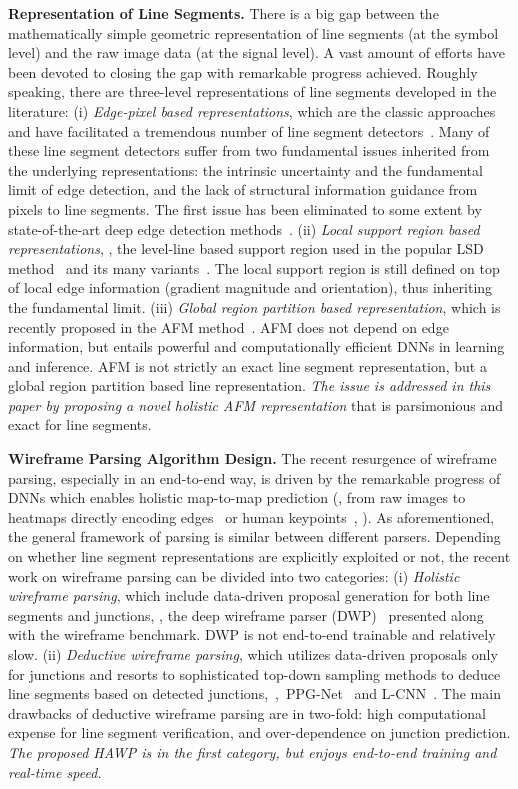 \documentclass[10pt,twocolumn,letterpaper]{article}
\begin{document}
\textbf{Representation of Line Segments.} There is a big gap between the mathematically simple geometric representation of line segments (at the symbol level) and the raw image data (at the signal level). A vast amount of efforts have been devoted to closing the gap with remarkable progress achieved. Roughly speaking, there are three-level representations of line segments developed in the literature: (i)\textit{ Edge-pixel based representations}, which are the classic approaches and have facilitated a tremendous number of line segment detectors~\cite{Ballard81,ppht,BurnsHR86,DesolneuxMM00,VonGioi2010,Cho2018,VonGioi2010,Almazan_2017_CVPR,Cho2018}. Many of these line segment detectors suffer from two fundamental issues inherited from the underlying representations: the intrinsic uncertainty and the fundamental limit of edge detection, and the lack of structural information guidance from pixels to line segments. The first issue has been eliminated to some extent by state-of-the-art deep edge detection methods~\cite{HED-IJCV,COB-PAMI}. (ii) \textit{Local support region based representations}, \eg, the level-line based support region used in the popular LSD method~\cite{VonGioi2010} and its many variants~\cite{AkinlarT11,Cho2018}. The local support region is still defined on top of local edge information (gradient magnitude and orientation), thus inheriting the fundamental limit. (iii) \textit{Global region partition based representation}, which is recently proposed in the AFM method~\cite{afm}. AFM does not depend on edge information, but entails powerful and computationally efficient DNNs in learning and inference. AFM is not strictly an exact line segment representation, but a global region partition based line representation. \textit{The issue is addressed in this paper by proposing a novel holistic AFM representation} that is parsimonious  and exact for line segments.        

\textbf{Wireframe Parsing Algorithm Design.} The recent resurgence of wireframe parsing, especially in an end-to-end way, is driven by the remarkable progress of DNNs which enables holistic map-to-map prediction (\eg, from raw images to heatmaps directly encoding edges~\cite{HED-IJCV} or human keypoints~\cite{ConvPose}, \etc). As aforementioned, the general framework of parsing is similar between different parsers. Depending on whether line segment representations are explicitly exploited or not, the recent work on wireframe parsing can be divided into two categories: (i) \textit{Holistic wireframe parsing}, which include data-driven proposal generation for both line segments and junctions, \eg, the deep wireframe parser (DWP)~\cite{Huang2018a} presented along with the wireframe benchmark. DWP is not end-to-end trainable and relatively slow. (ii) \textit{Deductive wireframe parsing}, which  utilizes data-driven proposals only for junctions and resorts to sophisticated top-down sampling methods to deduce line segments based on detected junctions,~\eg,~PPG-Net~\cite{ZhangLBZWHKXG19} and L-CNN~\cite{ZhouQM19}. The main drawbacks of deductive wireframe parsing are in two-fold: high computational expense for line segment verification, and over-dependence on junction prediction. \textit{The proposed HAWP is in the first category, but enjoys end-to-end training and real-time speed.}  
\end{document}
